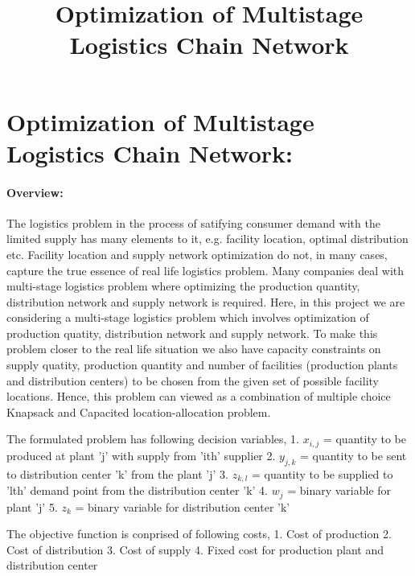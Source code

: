 \documentclass[11pt]{article}
\title{Optimization of Multistage Logistics Chain Network}
\begin{document}
    
    
    \maketitle
    
    

    
    \section{Optimization of Multistage Logistics Chain
Network:}\label{optimization-of-multistage-logistics-chain-network}

\paragraph{Overview:}\label{overview}

The logistics problem in the process of satifying consumer demand with
the limited supply has many elements to it, e.g. facility location,
optimal distribution etc. Facility location and supply network
optimization do not, in many cases, capture the true essence of real
life logistics problem. Many companies deal with multi-stage logistics
problem where optimizing the production quantity, distribution network
and supply network is required. Here, in this project we are considering
a multi-stage logistics problem which involves optimization of
production quatity, distribution network and supply network. To make
this problem closer to the real life situation we also have capacity
constraints on supply quatity, production quantity and number of
facilities (production plants and distribution centers) to be chosen
from the given set of possible facility locations. Hence, this problem
can viewed as a combination of multiple choice Knapsack and Capacited
location-allocation problem.

The formulated problem has following decision variables, 1. \(x_{i,j}\)
= quantity to be produced at plant 'j' with supply from 'ith' supplier
2. \(y_{j,k}\) = quantity to be sent to distribution center 'k' from the
plant 'j' 3. \(z_{k,l}\) = quantity to be supplied to 'lth' demand point
from the distribution center 'k' 4. \(w_{j}\) = binary variable for
plant 'j' 5. \(z_{k}\) = binary variable for distribution center 'k'

The objective function is conprised of following costs, 1. Cost of
production 2. Cost of distribution 3. Cost of supply 4. Fixed cost for
production plant and distribution center
\end{document}
